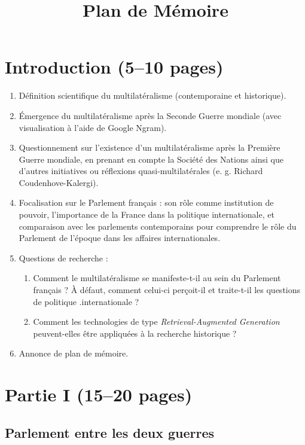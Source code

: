 \documentclass[12pt]{article}
\title{Plan de Mémoire}
\date{}
\begin{document}
\maketitle

\section*{Introduction (5--10 pages)}

\begin{enumerate}[label=\alph*.]
    \item Définition scientifique du multilatéralisme (contemporaine et historique).
    \item Émergence du multilatéralisme après la Seconde Guerre mondiale (avec visualisation à l’aide de Google Ngram).
    \item Questionnement sur l’existence d’un multilatéralisme après la Première Guerre mondiale, en prenant en compte la Société des Nations ainsi que d’autres initiatives ou réflexions quasi-multilatérales (e. g. Richard Coudenhove-Kalergi).
    \item Focalisation sur le Parlement français : son rôle comme institution de pouvoir, l’importance de la France dans la politique internationale, et comparaison avec les parlements contemporains pour comprendre le rôle du Parlement de l’époque dans les affaires internationales.
    \item{Questions de recherche :}
        \begin{enumerate}
        \item Comment le multilatéralisme se manifeste-t-il au sein du Parlement français ? À défaut, comment celui-ci perçoit-il et traite-t-il les questions de politique .internationale ?
        \item Comment les technologies de type \textit{Retrieval-Augmented Generation} peuvent-elles être appliquées à la recherche historique ?
        \end{enumerate}
    \item Annonce de plan de mémoire.
\end{enumerate}

\section*{Partie I (15--20 pages)}

\subsection*{Parlement entre les deux guerres}
\end{document}
